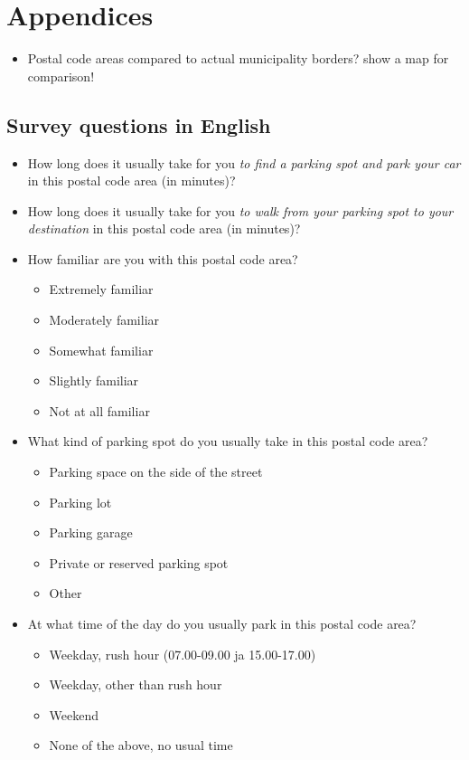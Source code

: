 \section{Appendices}
\justify
\begin{itemize}
  \item Postal code areas compared to actual municipality borders? show a map for comparison!
\end{itemize}

\subsection{Survey questions in English}
\justify
\begin{spacing}{1}
    \begin{itemize}
        \item How long does it usually take for you \textit{to find a parking spot and park your car} in this postal code area (in minutes)?
        \item How long does it usually take for you \textit{to walk from your parking spot to your destination} in this postal code area (in minutes)?
        \item How familiar are you with this postal code area?
        \begin{itemize}
            \item Extremely familiar
            \item Moderately familiar
            \item Somewhat familiar
            \item Slightly familiar
            \item Not at all familiar
        \end{itemize}
        \item What kind of parking spot do you usually take in this postal code area?
        \begin{itemize}
            \item Parking space on the side of the street
            \item Parking lot
            \item Parking garage
            \item Private or reserved parking spot
            \item Other
        \end{itemize}
        \item At what time of the day do you usually park in this postal code area?
        \begin{itemize}
            \item Weekday, rush hour (07.00-09.00 ja 15.00-17.00)
            \item Weekday, other than rush hour
            \item Weekend
            \item None of the above, no usual time
        \end{itemize}
    \end{itemize}
\end{spacing}

